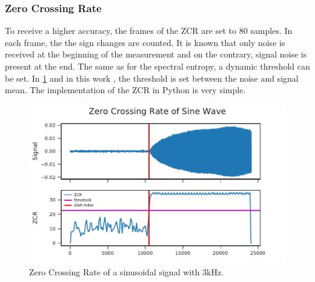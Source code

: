 
\subsubsection*{Zero Crossing Rate}

To receive a higher accuracy, the frames of the \ac{ZCR} are set to 80 samples.
In each frame, the the sign changes are counted.
It is known that only noise is received at the beginning of the measurement and on the
contrary, signal noise is present at the end.
The same as for the spectral entropy, a dynamic threshold can be set.
In \cref{fig:03_zcr} and in this work , the threshold is set between the
noise and signal mean.
The implementation of the \ac{ZCR} in Python is very simple.

\begin{figure}[ht]
	\centering
		\includegraphics[]{figures/sine_zcr}
	\caption{Zero Crossing Rate of a sinusoidal signal with 3\si{\kilo\hertz}.}
	\label{fig:03_zcr}
\end{figure}